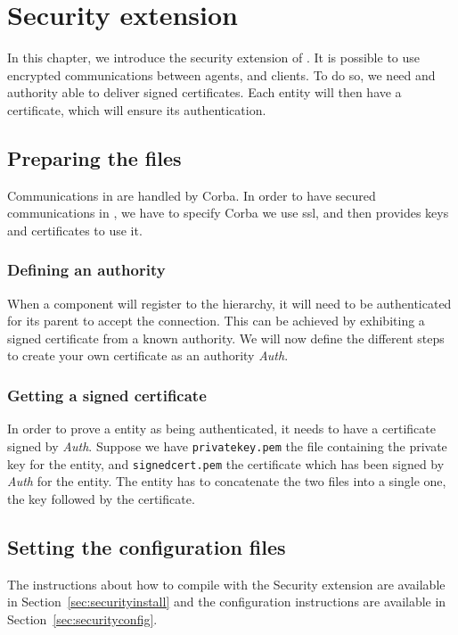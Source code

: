 
\newcommand{\auth}{\emph{Auth}\xspace}

\chapter{Security extension}
\label{ch:Securityextension}

In this chapter, we introduce the security extension of \diet. It is 
possible to use encrypted communications between agents, \seds and clients. 
To do so, we need and authority able to deliver signed certificates. Each 
entity will then have a certificate, which will ensure its authentication.

\section{Preparing the files}

Communications in \diet are handled by Corba. In order to have secured 
communications in \diet, we have to specify Corba we use ssl, and then 
provides keys and certificates to use it.

\subsection{Defining an authority}

When a component will register to the \diet hierarchy, it will need to be 
authenticated for its parent to accept the connection. This can be achieved 
by exhibiting a signed certificate from a known authority. We will now 
define the different steps to create your own certificate as an authority 
\auth.

\subsection{Getting a signed certificate}

In order to prove a \diet entity as being authenticated, it needs to have a 
certificate signed by \auth. Suppose we have \verb+privatekey.pem+ the file 
containing the private key for the entity, and \verb+signedcert.pem+ the 
certificate which has been signed by \auth for the entity. The entity has 
to concatenate the two files into a single one, the key followed by the 
certificate.

\section{Setting the configuration files}

The instructions about how to compile \diet with the Security extension are 
available in Section~\ref{sec:securityinstall} and the configuration 
instructions are available in Section~\ref{sec:securityconfig}.



